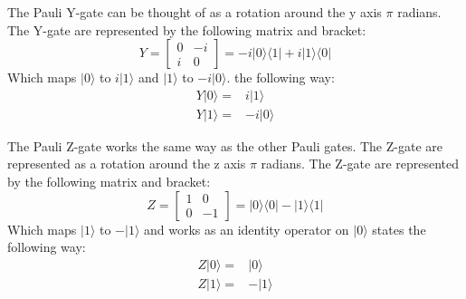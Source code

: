\documentclass[../main.tex]{subfiles}
\begin{document}
The Pauli Y-gate can be thought of as a rotation around the y axis \ensuremath{\pi} radians. The Y-gate are represented by the following matrix and bracket:
\begin{equation}
    Y=\begin{bmatrix}
    0 & -i\\
    i & 0
    \end{bmatrix}
    =-i|0\rangle\langle1|+i|1\rangle\langle 0|
\end{equation}
Which maps \ensuremath{|0\rangle} to \ensuremath{i|1\rangle} and \ensuremath{|1\rangle} to \ensuremath{-i|0\rangle}. the following way:
\begin{align}
        Y|0\rangle=&i|1\rangle\\
        Y|1\rangle=&-i|0\rangle
\end{align}

The Pauli Z-gate works the same way as the other Pauli gates. The Z-gate are represented as a rotation around the z axis \ensuremath{\pi} radians. The Z-gate are represented by the following matrix and bracket:
\begin{equation}
    Z=\begin{bmatrix}
    1 & 0\\
    0 & -1
    \end{bmatrix}
    =|0\rangle\langle0|-|1\rangle\langle 1|
\end{equation}
Which maps \ensuremath{|1\rangle} to \ensuremath{-|1\rangle} and works as an identity operator on \ensuremath{|0\rangle} states the following way:
\begin{align}
        Z|0\rangle=&|0\rangle\\
        Z|1\rangle=&-|1\rangle
\end{align}
\end{document}
